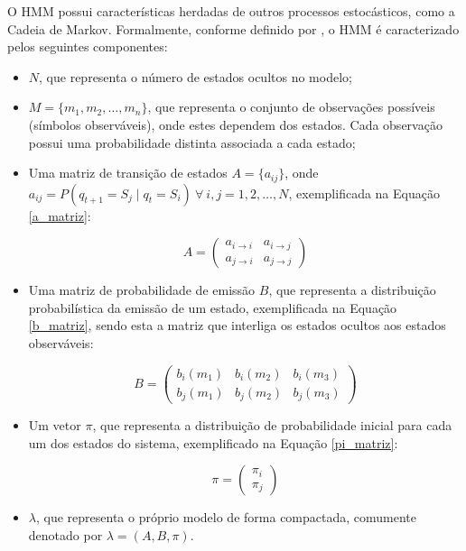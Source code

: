 \documentclass[
    12pt,                %
    openright,           %
    oneside,             %
    a4paper,             %
    english,             %
    brazil               %
]{abntex2}
\begin{document}
O HMM possui características herdadas de outros processos estocásticos, como a Cadeia de Markov.
Formalmente, conforme definido por , o HMM é caracterizado pelos seguintes componentes:

\begin{itemize}
    \item $N$, que representa o número de estados ocultos no modelo;
    
    \item $M = \{m_1, m_2, \dots, m_n\}$, que representa o conjunto de observações possíveis (símbolos observáveis), 
    onde estes dependem dos estados. Cada observação possui uma probabilidade distinta associada a cada estado;

    \item Uma matriz de transição de 
    estados $A = \{a_{ij}\}$, onde $a_{ij} = P(q_{t+1} = S_j \mid q_t = S_i) \ \forall \ i,j = 1, 2, \dots, N$, 
    exemplificada na Equação \ref{a_matriz}:

    \begin{equation}
        A = \begin{pmatrix}
            a_{i \to i} & a_{i \to j} \\
            a_{j \to i} & a_{j \to j}
        \end{pmatrix}
        \label{a_matriz}
    \end{equation}

    \item Uma matriz de probabilidade de emissão $B$, que representa a distribuição probabilística da emissão de um estado, 
    exemplificada na Equação \ref{b_matriz}, sendo esta a matriz que interliga os estados ocultos aos estados observáveis:

    \begin{equation}
        B = \begin{pmatrix}
            b_i(m_1) & b_i(m_2) & b_i(m_3) \\
            b_j(m_1) & b_j(m_2) & b_j(m_3)
        \end{pmatrix}
        \label{b_matriz}
    \end{equation}

    \item Um vetor $\pi$, que representa a distribuição de probabilidade inicial para cada um dos estados do sistema, 
    exemplificado na Equação \ref{pi_matriz}:

    \begin{equation}
        \pi = \begin{pmatrix}
            \pi_i \\
            \pi_j
        \end{pmatrix}
        \label{pi_matriz}
    \end{equation}

    \item $\lambda$, que representa o próprio modelo de forma compactada, comumente denotado por $\lambda = (A, B, \pi)$.
\end{itemize}
\end{document}
